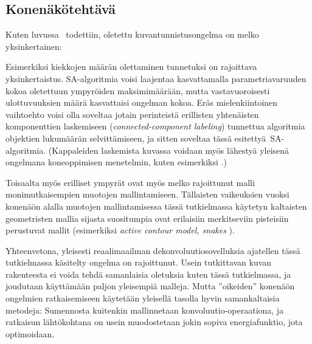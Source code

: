 \subsection{Konenäkötehtävä}
\label{sub:jp_konenako}

Kuten luvussa~ todettiin, oletettu kuvantunnistusongelma on melko yksinkertainen:

Esimerkiksi kiekkojen määrän olettaminen tunnetuksi on rajoittava yksinkertaistus.
SA-algoritmia voisi laajentaa kasvattamalla parametriavaruuden kokoa oletettuun ympyröiden maksimimäärään,
mutta vastavuoroisesti ulottuvuuksien määrä kasvattaisi ongelman kokoa.
Eräs mielenkiintoinen vaihtoehto voisi olla soveltaa jotain perinteistä erillisten yhtenäisten komponenttien laskemiseen (\emph{connected-component labeling}) tunnettua algoritmia \cite{cormenetal09} objektien lukumäärän selvittämiseen,
ja sitten soveltaa tässä esitettyä SA-algoritmia.
(Kappaleiden laskemista kuvassa voidaan myös lähestyä yleisenä ongelmana koneoppimisen menetelmin, kuten esimerkiksi \cite{lempitskyzissermanNIPS10}.)

Toisaalta myös erilliset ympyrät ovat myös melko rajoittunut malli monimutkaisempien muotojen mallintamiseen.
Tällaisten vaikeuksien vuoksi konenäön alalla muotojen mallintamisessa  tässä tutkielmassa käytetyn kaltaisten geometristen mallia sijasta suositumpia ovat erilaisiin merkitseviin pisteisiin perustuvat mallit (esimerkiksi \emph{active contour model, snakes} \cite{prince2012}).

Yhteenvetona, yleisesti reaalimaailman dekonvoluutiosovelluksia ajatellen tässä tutkielmassa käsitelty ongelma on rajoittunut.
Usein tutkittavan kuvan rakenteesta ei voida tehdä samanlaisia oletuksia kuten tässä tutkielmassa, ja joudutaan käyttämään paljon yleisempiä malleja.
Mutta ''oikeiden'' konenäön ongelmien ratkaisemiseen käytetään yleisellä tasolla hyvin samankaltaisia metodeja:
Sumennosta kuitenkin mallinnetaan konvoluutio-operaationa,
ja ratkaisun lähtökohtana on usein muodostetaan jokin sopiva energiafunktio, jota optimoidaan.
